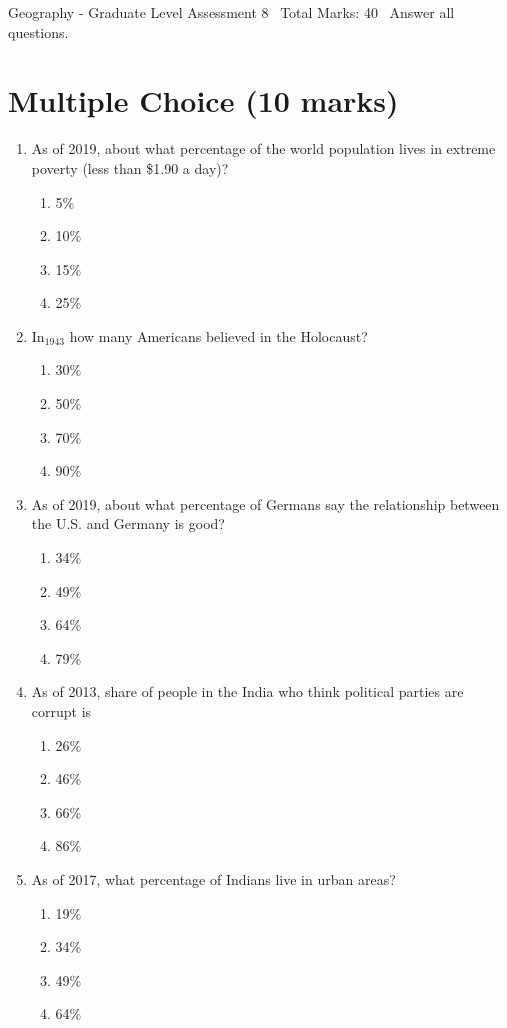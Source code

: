 \documentclass[12pt]{article}
\begin{document}
\begin{center}
Geography - Graduate Level Assessment 8 \
Total Marks: 40 \
Answer all questions.
\end{center}

\section*{Multiple Choice (10 marks)}
\begin{enumerate}[label=\arabic*.]
\item As of 2019, about what percentage of the world population lives in extreme poverty (less than \$1.90 a day)?
\begin{enumerate}[label=(\alph*)]
    \item 5\%
    \item 10\%
    \item 15\%
    \item 25\%
\end{enumerate}
\item In$_{1943}$ how many Americans believed in the Holocaust?
\begin{enumerate}[label=(\alph*)]
    \item 30\%
    \item 50\%
    \item 70\%
    \item 90\%
\end{enumerate}
\item As of 2019, about what percentage of Germans say the relationship between the U.S. and Germany is good?
\begin{enumerate}[label=(\alph*)]
    \item 34\%
    \item 49\%
    \item 64\%
    \item 79\%
\end{enumerate}
\item As of 2013, share of people in the India who think political parties are corrupt is
\begin{enumerate}[label=(\alph*)]
    \item 26\%
    \item 46\%
    \item 66\%
    \item 86\%
\end{enumerate}
\item As of 2017, what percentage of Indians live in urban areas?
\begin{enumerate}[label=(\alph*)]
    \item 19\%
    \item 34\%
    \item 49\%
    \item 64\%
\end{enumerate}
\end{enumerate}
\end{document}
